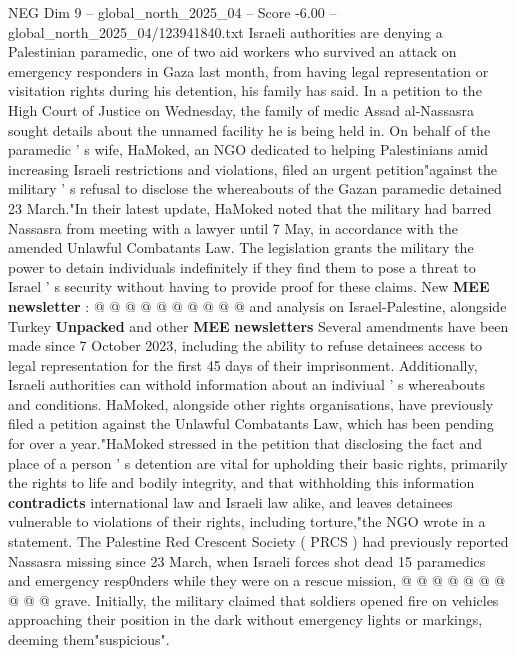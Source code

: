 \begin{textsample}{NEG Dim 9 – global\_north\_2025\_04 – Score -6.00 – global\_north\_2025\_04/123941840.txt}  \label{ex:f9_neg_033}
Israeli authorities are denying a Palestinian paramedic, one of two aid workers who survived an attack on emergency responders in Gaza last month, from having legal representation or visitation rights during his detention, his family has said.
In a petition to the High Court of Justice on Wednesday, the family of medic Assad al-Nassasra sought details about the unnamed facility he is being held in.
On behalf of the paramedic ' s wife, HaMoked, an NGO dedicated to helping Palestinians amid increasing Israeli restrictions and violations, filed an urgent petition"against the military ' s refusal to disclose the whereabouts of the Gazan paramedic detained 23 March."In their latest update, HaMoked noted that the military had barred Nassasra from meeting with a lawyer until 7 May, in accordance with the amended Unlawful Combatants Law.
The legislation grants the military the power to detain individuals indefinitely if they find them to pose a threat to Israel ' s security without having to provide proof for these claims.
New \textbf{MEE} \textbf{newsletter} : @ @ @ @ @ @ @ @ @ @ and analysis on Israel-Palestine, alongside Turkey \textbf{Unpacked} and other \textbf{MEE} \textbf{newsletters} Several amendments have been made since 7 October 2023, including the ability to refuse detainees access to legal representation for the first 45 days of their imprisonment.
Additionally, Israeli authorities can withold information about an indiviual ' s whereabouts and conditions.
HaMoked, alongside other rights organisations, have previously filed a petition against the Unlawful Combatants Law, which has been pending for over a year."HaMoked stressed in the petition that disclosing the fact and place of a person ' s detention are vital for upholding their basic rights, primarily the rights to life and bodily integrity, and that withholding this information \textbf{contradicts} international law and Israeli law alike, and leaves detainees vulnerable to violations of their rights, including torture,"the NGO wrote in a statement.
The Palestine Red Crescent Society ( PRCS ) had previously reported Nassasra missing since 23 March, when Israeli forces shot dead 15 paramedics and emergency resp0nders while they were on a rescue mission, @ @ @ @ @ @ @ @ @ @ grave.
Initially, the military claimed that soldiers opened fire on vehicles approaching their position in the dark without emergency lights or markings, deeming them"suspicious".

\end{textsample}
